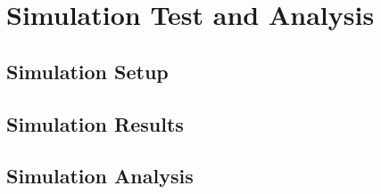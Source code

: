
\section{Simulation Test and Analysis}



\vspace*{6mm}  

\subsection{Simulation Setup}
\subsection{Simulation Results}
\subsection{Simulation Analysis} 
